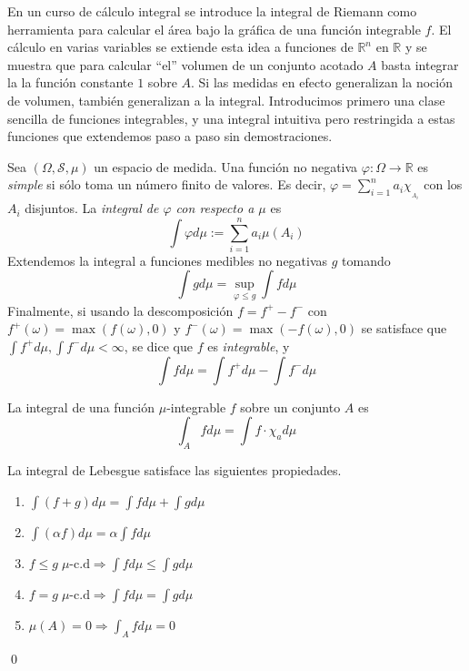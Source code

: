\documentclass[main.tex]{subfiles}
\begin{document}
En un curso de cálculo integral se introduce la integral de Riemann como herramienta para calcular el área bajo la gráfica de una función integrable $f$. El cálculo en varias variables se extiende esta idea a funciones de $\mathbb{R}^n$ en $\mathbb{R}$ y se muestra que para calcular \enquote{el} volumen de un conjunto acotado $A$ basta integrar la la función constante $1$ sobre $A$. Si las medidas en efecto generalizan la noción de volumen, también generalizan a la integral. Introducimos primero una clase sencilla de funciones integrables, y una integral intuitiva pero restringida a estas funciones que extendemos paso a paso sin demostraciones.

\begin{definition}\label{def:int}
Sea $(\Omega, \mathcal{S}, \mu)$ un espacio de medida. Una función no negativa $\varphi:\Omega\to\mathbb{R}$ es \textit{simple} si sólo toma un número finito de valores. Es decir, $\varphi=\sum_{i=1}^na_i\chi_{_{A_i}}$ con los $A_i$ disjuntos. La \textit{integral de $\varphi$ con respecto a $\mu$} es
\begin{equation*}
	\int\varphi d\mu := \sum_{i=1}^n a_i\mu(A_i)
\end{equation*}
Extendemos la integral a funciones medibles no negativas $g$ tomando
\begin{equation*}
	\int g d\mu = \sup_{\varphi \leq g}\int fd\mu
\end{equation*}
 Finalmente, si usando la descomposición $f=f^+ -f^-$ con $f^+(\omega)=\max\left(f(\omega), 0\right)$ y $f^-(\omega)=\max\left(-f(\omega), 0\right)$ se satisface que $\int f^+d\mu, \int f^-d\mu < \infty$, se dice que $f$ es \textit{integrable}, y
 \begin{equation*}
 \int f d\mu = 	\int f^+d\mu - \int f^-d\mu
 \end{equation*}
\end{definition}

\begin{definition}
	La integral de una función $\mu$-integrable $f$ sobre un conjunto $A$ es
	\begin{equation*}
	\int_A fd\mu = \int f\cdot\chi_a d\mu	
	\end{equation*}
\end{definition}

\begin{prop}\label{thm:props-int}
La integral de Lebesgue satisface las siguientes propiedades.
\begin{enumerate}[label=\roman*.]
	\item $\int (f+g)d\mu = \int f d\mu + \int g d\mu$
	\item $\int(\alpha f)d\mu = \alpha \int f d\mu$
	\item $f \leq g \; \mu\text{-c.d} \Rightarrow \int fd\mu \leq \int gd\mu$
	\item $f = g\; \mu\text{-c.d} \Rightarrow \int fd\mu = \int gd\mu$
	\item $\mu(A)=0\Rightarrow \int_Afd\mu=0$
\end{enumerate}
\qed
\end{prop}
\end{document}
